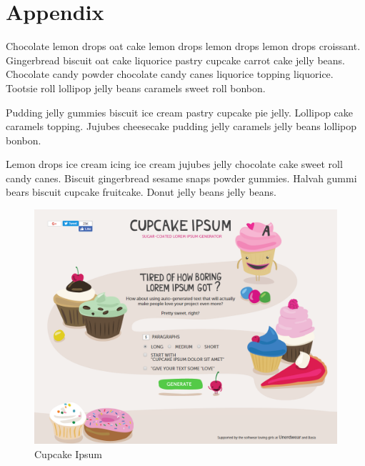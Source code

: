 \appendix

\section{Appendix}\label{appendix}

Chocolate lemon drops oat cake lemon drops lemon drops lemon drops
croissant. Gingerbread biscuit oat cake liquorice pastry cupcake carrot
cake jelly beans. Chocolate candy powder chocolate candy canes liquorice
topping liquorice. Tootsie roll lollipop jelly beans caramels sweet roll
bonbon.

Pudding jelly gummies biscuit ice cream pastry cupcake pie jelly.
Lollipop cake caramels topping. Jujubes cheesecake pudding jelly
caramels jelly beans lollipop bonbon.

Lemon drops ice cream icing ice cream jujubes jelly chocolate cake sweet
roll candy canes. Biscuit gingerbread sesame snaps powder gummies.
Halvah gummi bears biscuit cupcake fruitcake. Donut jelly beans jelly
beans.

\begin{figure}[htbp]
\centering
\includegraphics{survey/appendix/printout1.png}
\caption{Cupcake Ipsum}
\end{figure}
